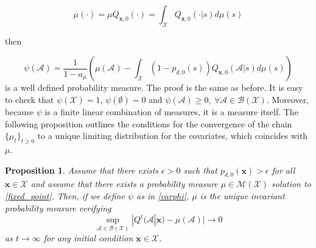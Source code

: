\documentclass[12pt,a4paper]{article}
\newcommand{\blue}[1]{{\color{blue}{#1}}}
\newtheorem{proposition}{Proposition}
\newcommand{\bx}{\mathbf{x}}
\begin{document}
	\begin{equation} \label{fixed_point}
		\mu(\cdot)=\mu Q_{\bx,0}(\cdot)= \int_{\mathcal{X}} Q_{\bx,0}(\cdot |s) d\mu (s)
	\end{equation}
	
	
	\noindent then 
	
	\begin{equation}\label{varphi}
		\psi(\mathcal{A})=\frac{1}{1-a_\mu} \left(\mu(\mathcal{A}) - \int_{\mathcal{X}} (1-p_{d,0}(s)) Q_{\bx,0}(\mathcal{A}|s) d\mu(s)  \right)
	\end{equation}
	is a well defined probability measure. The proof is the same as before. It is easy to check that $\psi(\mathcal{X})=1$, $\psi(\emptyset)=0$ and $\psi(\mathcal{A})\geq 0, \ \forall \mathcal{A} \in \mathcal{B}(\mathcal{X})$. Moreover, because $\psi$ is a finite linear combination of measures, it is a measure itself. The following proposition outlines the conditions for the convergence of the chain $\{\mu_t\}_{t\geq0}$ to a unique limiting distribution for the covariates, which coincides with $\mu$.



	

	\begin{proposition}\label{prop_convergence}
		Assume  that there exists $\epsilon>0$ such that $p_{d,0}(\bx)>\epsilon$ for all $\bx \in \mathcal{X}$ and assume that there exists a probability measure $\mu \in \mathcal{M}(\mathcal{X})$ solution to \eqref{fixed_point}. Then, if we define $\psi$ as in \eqref{varphi}, 
		$\mu$ is the unique invariant probability measure verifying
		\begin{equation} \label{mu_limit}
			\sup_{\mathcal{A} \in \mathcal{B}(\mathcal{X})} |Q^t(\mathcal{A}|\bx) -\mu(\mathcal{A})| \rightarrow 0  
		\end{equation}
		as $t \rightarrow \infty$ for any initial condition $\bx \in \mathcal{X}$.
	\end{proposition}
	
\end{document}
